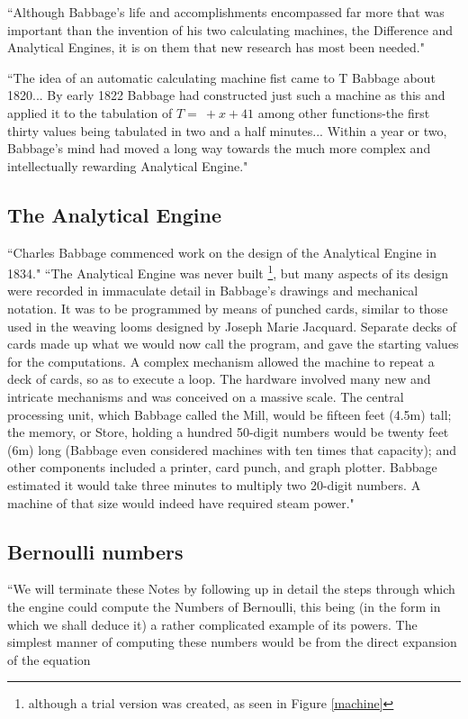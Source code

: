 \documentclass[a4paper, 12pt]{article}
\begin{document}
``Although Babbage's life and accomplishments encompassed far more that was important than the invention of his two calculating machines, the Difference and Analytical Engines, it is on them that new research has most been needed." \cite{collier}

``The idea of an automatic calculating machine fist came to T Babbage about 1820... By early 1822 Babbage had constructed just such a machine as this and applied it to the tabulation of $ T =~+x + 41$ among other functions-the first thirty values being tabulated in two and a half minutes... Within a year or two, Babbage’s mind had moved a long way towards the much more complex and intellectually rewarding Analytical Engine." \cite{cbc}

\subsection{The Analytical Engine}

``Charles Babbage commenced work on the design of the Analytical Engine in 1834." \cite{bromley} ``The Analytical Engine was never built \footnote{although a trial version was created, as seen in Figure \ref{machine}}, but many aspects of its design were recorded in immaculate detail in Babbage’s drawings and mechanical notation. It was to be programmed by means of punched cards, similar to those used in the weaving looms designed by Joseph Marie Jacquard. Separate decks of cards made up what we would now call the program, and gave the starting values for the computations. A complex mechanism allowed the machine to repeat a deck of cards, so as to execute a loop. The hardware involved many new and intricate mechanisms and was conceived on a massive scale. The central processing unit, which Babbage called the Mill, would be fifteen feet (4.5m) tall; the memory, or Store, holding a hundred 50-digit numbers would be twenty feet (6m) long (Babbage even considered machines with ten times that capacity); and other components included a printer, card punch, and graph plotter. Babbage estimated it would take three minutes to multiply two 20-digit numbers. A machine of that size would indeed have required steam power." \cite{bodleian}

\subsection{Bernoulli numbers}

``We will terminate these Notes by following up in detail the steps through which the engine could compute the Numbers of Bernoulli, this being (in the form in which we shall deduce it) a rather complicated example of its powers. The simplest manner of computing these numbers would be from the direct expansion of the equation
\end{document}
